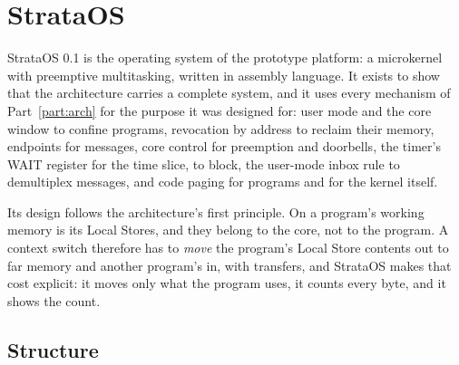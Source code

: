 \chapter{StrataOS}\label{ch:os}

StrataOS 0.1 is the operating system of the prototype platform: a microkernel with preemptive
multitasking, written in \IS assembly language. It exists to show that the architecture carries a
complete system, and it uses every mechanism of Part~\ref{part:arch} for the purpose it was designed
for: user mode and the core window to confine programs, revocation by address to reclaim their memory,
endpoints for messages, core control for preemption and doorbells, the timer's WAIT register for the
time slice,  to block, the user-mode inbox rule to demultiplex messages, and code paging for
programs and for the kernel itself.

Its design follows the architecture's first principle. On \IS a program's working memory is its Local
Stores, and they belong to the core, not to the program. A context switch therefore has to \emph{move}
the program's Local Store contents out to far memory and another program's in, with transfers, and
StrataOS makes that cost explicit: it moves only what the program uses, it counts every byte, and it
shows the count.

\section{Structure}\label{sec:os-shape}

